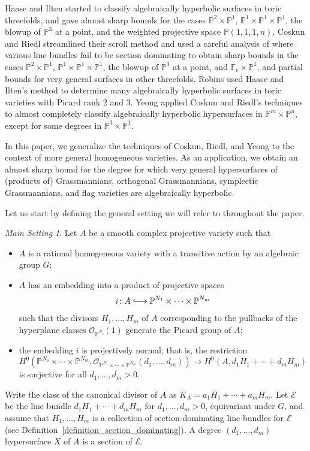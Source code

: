 \documentclass[11pt]{amsart}
\numberwithin{equation}{section}
\theoremstyle{definition}
\theoremstyle{remark}
\newtheorem{setting}[theorem]{Main Setting}
\newcommand{\cO}{\mathcal{O}}
\renewcommand{\P}{\mathbb{P}}
\newcommand{\longhookrightarrow}{\lhook\joinrel\longrightarrow}
\newcommand{\lra}{\longrightarrow}
\begin{document}
Haase and Ilten \cite{HI21} started to classify algebraically hyperbolic surfaces in toric threefolds, and gave almost sharp bounds for the cases $\P^2\times \P^1$, $\P^1\times \P^1\times \P^1$, the blowup of $\P^3$ at a point, and the weighted projective space $\P(1,1,1,n)$. Coskun and Riedl \cite{CR19} streamlined their scroll method and used a careful analysis of where various line bundles fail to be section dominating to obtain sharp bounds in the cases $\P^2\times \P^1$, $\P^1\times \P^1\times \P^1$, the blowup of $\P^3$ at a point, and $\mathbb{F}_e\times \P^1$, and partial bounds for very general surfaces in other threefolds. Robins \cite{Rob23} used Haase and Ilten's method to determine many algebraically hyperbolic surfaces in toric varieties with Picard rank 2 and 3. Yeong \cite{Y22} applied Coskun and Riedl's techniques to almost completely classify algebraically hyperbolic hypersurfaces in $\P^m\times \P^n$, except for some degrees in $\P^3\times \P^1$.

In this paper, we generalize the techniques of Coskun, Riedl, and Yeong to the context of more general homogeneous varieties. As an application, we obtain an almost sharp bound for the degree for which very general hypersurfaces of (products of) Grassmannians, orthogonal Grassmannians, symplectic Grassmannians, and flag varieties are algebraically hyperbolic.

Let us start by defining the general setting we will refer to throughout the paper.

\begin{setting}\label{main_setting}
    Let $A$ be a smooth complex projective variety such that
    \begin{itemize}
        \item $A$ is a rational homogeneous variety with a transitive action by an algebraic group $G$;
        \item $A$ has an embedding into a product of projective spaces
        \[ i\colon A\longhookrightarrow \P^{N_1}\times \cdots \times \P^{N_m} \]
        such that the divisors $H_1, \hdots , H_m$ of $A$ corresponding to the pullbacks of the hyperplane classes $\cO_{\P^{N_i}}(1)$ generate the Picard group of $A$;
        \item the embedding $i$ is projectively normal; that is, the restriction
        \[ H^0\left (\P^{N_1}\times \cdots \times \P^{N_m}, \cO_{\P^{N_1}\times \cdots \times \P^{N_m}}(d_1,\ldots ,d_m)\right )\lra H^0(A,d_1H_1+\cdots +d_mH_m) \]
        is surjective for all $d_1,\ldots,d_m > 0$.
    \end{itemize}

    Write the class of the canonical divisor of $A$ as $K_A = a_1H_1 + \cdots + a_mH_m$. Let $\mathcal{E}$ be the line bundle $d_1H_1 + \cdots + d_mH_m$ for $d_1,\hdots ,d_m >0$, equivariant under $G$, and assume that $H_1, \hdots , H_m$ is a collection of section-dominating line bundles for $\mathcal{E}$ (see Definition~\ref{definition_section_dominating}). A degree $(d_1, \hdots , d_m)$ hypersurface $X$ of $A$ is a section of $\mathcal{E}$.
\end{setting}
\end{document}
